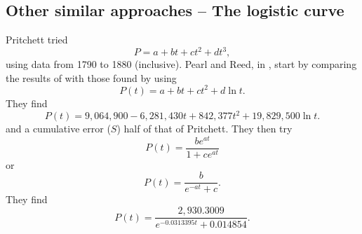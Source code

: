 
\subsection{Other similar approaches -- The logistic curve}
Pritchett \cite{Pritchett1891} tried
\[
P=a+bt+ct^2+dt^3,
\]
using data from 1790 to 1880 (inclusive).
Pearl and Reed, in \cite{PearlReed1920}, start by comparing the results of \cite{Pritchett1891} with those found by using 
\[
P(t)=a+bt+ct^2+d\ln t.
\]
They find
\[
P(t)=9,064,900-6,281,430t+842,377t^2+19,829,500\ln t.
\]
and a cumulative error ($S$) half of that of Pritchett.
They then try
\[
P(t)=\frac{be^{at}}{1+ce^{at}}
\]
or
\begin{equation}\label{eq:logistic_curve}
P(t)=\frac{b}{e^{-at}+c}.
\end{equation}
They find
\[
P(t)=\frac{2,930.3009}{e^{-0.0313395t}+0.014854}.
\]


